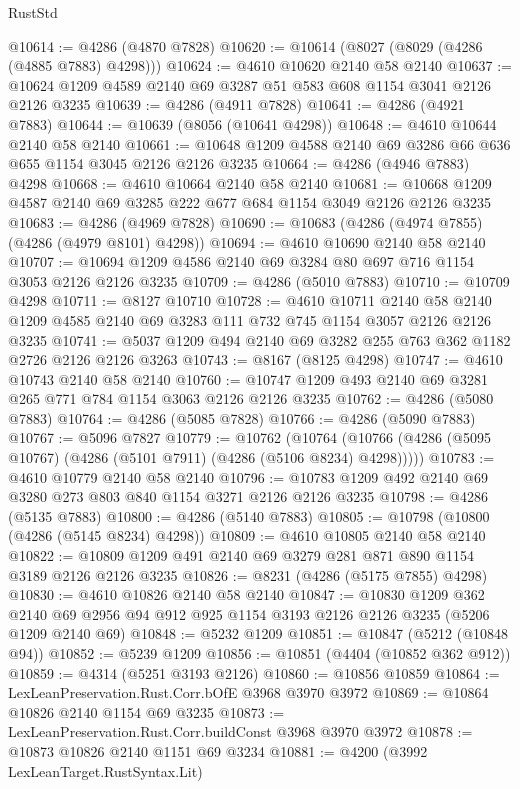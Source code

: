 \begin{lexlean}{RustStd}
\begin{coremodule}
@10614 := @4286 (@4870 @7828)
@10620 := @10614 (@8027 (@8029 (@4286 (@4885 @7883) @4298)))
@10624 := @4610 @10620 @2140 @58 @2140
@10637 := @10624 @1209 @4589 @2140 @69 @3287 @51 @583 @608 @1154 @3041 @2126 @2126 @3235
@10639 := @4286 (@4911 @7828)
@10641 := @4286 (@4921 @7883)
@10644 := @10639 (@8056 (@10641 @4298))
@10648 := @4610 @10644 @2140 @58 @2140
@10661 := @10648 @1209 @4588 @2140 @69 @3286 @66 @636 @655 @1154 @3045 @2126 @2126 @3235
@10664 := @4286 (@4946 @7883) @4298
@10668 := @4610 @10664 @2140 @58 @2140
@10681 := @10668 @1209 @4587 @2140 @69 @3285 @222 @677 @684 @1154 @3049 @2126 @2126 @3235
@10683 := @4286 (@4969 @7828)
@10690 := @10683 (@4286 (@4974 @7855) (@4286 (@4979 @8101) @4298))
@10694 := @4610 @10690 @2140 @58 @2140
@10707 := @10694 @1209 @4586 @2140 @69 @3284 @80 @697 @716 @1154 @3053 @2126 @2126 @3235
@10709 := @4286 (@5010 @7883)
@10710 := @10709 @4298
@10711 := @8127 @10710
@10728 := @4610
    @10711
    @2140
    @58
    @2140
    @1209
    @4585
    @2140
    @69
    @3283
    @111
    @732
    @745
    @1154
    @3057
    @2126
    @2126
    @3235
@10741 := @5037 @1209 @494 @2140 @69 @3282 @255 @763 @362 @1182 @2726 @2126 @2126 @3263
@10743 := @8167 (@8125 @4298)
@10747 := @4610 @10743 @2140 @58 @2140
@10760 := @10747 @1209 @493 @2140 @69 @3281 @265 @771 @784 @1154 @3063 @2126 @2126 @3235
@10762 := @4286 (@5080 @7883)
@10764 := @4286 (@5085 @7828)
@10766 := @4286 (@5090 @7883)
@10767 := @5096 @7827
@10779 := @10762
    (@10764 (@10766 (@4286 (@5095 @10767) (@4286 (@5101 @7911) (@4286 (@5106 @8234) @4298)))))
@10783 := @4610 @10779 @2140 @58 @2140
@10796 := @10783 @1209 @492 @2140 @69 @3280 @273 @803 @840 @1154 @3271 @2126 @2126 @3235
@10798 := @4286 (@5135 @7883)
@10800 := @4286 (@5140 @7883)
@10805 := @10798 (@10800 (@4286 (@5145 @8234) @4298))
@10809 := @4610 @10805 @2140 @58 @2140
@10822 := @10809 @1209 @491 @2140 @69 @3279 @281 @871 @890 @1154 @3189 @2126 @2126 @3235
@10826 := @8231 (@4286 (@5175 @7855) @4298)
@10830 := @4610 @10826 @2140 @58 @2140
@10847 := @10830
    @1209
    @362
    @2140
    @69
    @2956
    @94
    @912
    @925
    @1154
    @3193
    @2126
    @2126
    @3235
    (@5206 @1209 @2140 @69)
@10848 := @5232 @1209
@10851 := @10847 (@5212 (@10848 @94))
@10852 := @5239 @1209
@10856 := @10851 (@4404 (@10852 @362 @912))
@10859 := @4314 (@5251 @3193 @2126)
@10860 := @10856 @10859
@10864 := LexLeanPreservation.Rust.Corr.bOfE @3968 @3970 @3972
@10869 := @10864 @10826 @2140 @1154 @69 @3235
@10873 := LexLeanPreservation.Rust.Corr.buildConst @3968 @3970 @3972
@10878 := @10873 @10826 @2140 @1151 @69 @3234
@10881 := @4200 (@3992 LexLeanTarget.RustSyntax.Lit)

\end{coremodule}
\end{lexlean}
